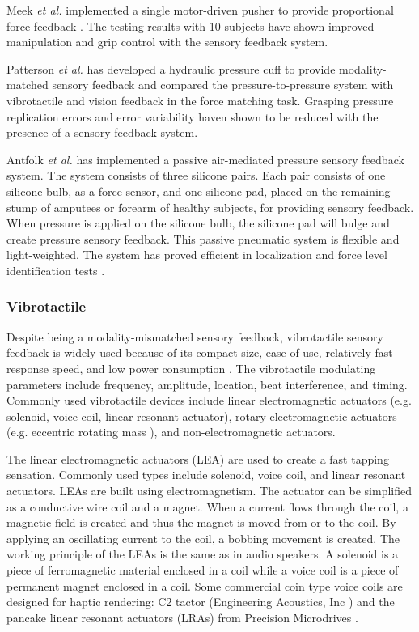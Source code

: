 Meek \textit{et al.} implemented a single motor-driven pusher to provide proportional force feedback \cite{meek1989extended}. The testing results with 10 subjects have shown improved manipulation and grip control with the sensory feedback system.

Patterson \textit{et al.} has developed a hydraulic pressure cuff to provide modality-matched sensory feedback and compared the pressure-to-pressure system with vibrotactile and vision feedback in the force matching task. Grasping pressure replication errors and error variability haven shown to be reduced with the presence of a sensory feedback system.

Antfolk \textit{et al.} has implemented a passive air-mediated pressure sensory feedback system. The system consists of three silicone pairs. Each pair consists of one silicone bulb, as a force sensor, and one silicone pad, placed on the remaining stump of amputees or forearm of healthy subjects, for providing sensory feedback. When pressure is applied on the silicone bulb,  the silicone pad will bulge and create pressure sensory feedback. This passive pneumatic system is flexible and light-weighted. The system has proved efficient in localization and force level identification tests \cite{antfolk2013sensory}.

\subsubsection{Vibrotactile}
Despite being a modality-mismatched sensory feedback, vibrotactile sensory feedback is widely used because of its compact size, ease of use, relatively fast response speed,  and low power consumption \cite{schofield2014applications}. The vibrotactile modulating parameters include frequency, amplitude, location, beat interference, and timing. Commonly used vibrotactile devices include linear electromagnetic actuators (e.g. solenoid, voice coil, linear resonant actuator), rotary electromagnetic actuators (e.g. eccentric rotating mass ), and non-electromagnetic actuators. 

The linear electromagnetic actuators (LEA) are used to create a fast tapping sensation. Commonly used types include solenoid, voice coil, and linear resonant actuators. LEAs are built using electromagnetism. The actuator can be simplified as a conductive wire coil and a magnet. When a current flows through the coil, a magnetic field is created and thus the magnet is moved from or to the coil. By applying an oscillating current to the coil, a bobbing movement is created. The working principle of the LEAs is the same as in audio speakers. A solenoid is a piece of ferromagnetic material enclosed in a coil while a voice coil is a piece of permanent magnet enclosed in a coil. Some commercial coin type voice coils are designed for haptic rendering: C2 tactor (Engineering Acoustics, Inc \cite{c2_tactor}) and the pancake linear resonant actuators (LRAs) from Precision Microdrives \cite{linear_resonant_actuators}.


